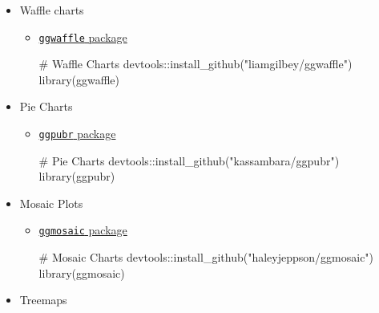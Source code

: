 \documentclass[
  letterpaper,
  DIV=11,
  numbers=noendperiod,
  oneside]{scrreprt}
\newenvironment{Shaded}{\begin{snugshade}}{\end{snugshade}}
\newcommand{\CommentTok}[1]{\textcolor[rgb]{0.37,0.37,0.37}{#1}}
\newcommand{\FunctionTok}[1]{\textcolor[rgb]{0.28,0.35,0.67}{#1}}
\newcommand{\NormalTok}[1]{\textcolor[rgb]{0.00,0.23,0.31}{#1}}
\newcommand{\SpecialCharTok}[1]{\textcolor[rgb]{0.37,0.37,0.37}{#1}}
\newcommand{\StringTok}[1]{\textcolor[rgb]{0.13,0.47,0.30}{#1}}
\begin{document}
\begin{itemize}
\item[$\boxtimes$]
  Waffle charts

  \begin{itemize}
  \item
    \href{https://liamgilbey.github.io/ggwaffle/}{\texttt{ggwaffle}
    package}

\begin{Shaded}
\begin{Highlighting}[]
\CommentTok{\# Waffle Charts}
\NormalTok{devtools}\SpecialCharTok{::}\FunctionTok{install\_github}\NormalTok{(}\StringTok{"liamgilbey/ggwaffle"}\NormalTok{)}
\FunctionTok{library}\NormalTok{(ggwaffle)}
\end{Highlighting}
\end{Shaded}
  \end{itemize}
\item[$\boxtimes$]
  Pie Charts

  \begin{itemize}
  \item
    \href{https://rpkgs.datanovia.com/ggpubr/}{\texttt{ggpubr} package}

\begin{Shaded}
\begin{Highlighting}[]
\CommentTok{\# Pie Charts }
\NormalTok{devtools}\SpecialCharTok{::}\FunctionTok{install\_github}\NormalTok{(}\StringTok{"kassambara/ggpubr"}\NormalTok{)}
\FunctionTok{library}\NormalTok{(ggpubr)}
\end{Highlighting}
\end{Shaded}
  \end{itemize}
\item[$\boxtimes$]
  Mosaic Plots

  \begin{itemize}
  \item
    \href{https://haleyjeppson.github.io/ggmosaic/}{\texttt{ggmosaic}
    package}

\begin{Shaded}
\begin{Highlighting}[]
\CommentTok{\# Mosaic Charts }
\NormalTok{devtools}\SpecialCharTok{::}\FunctionTok{install\_github}\NormalTok{(}\StringTok{"haleyjeppson/ggmosaic"}\NormalTok{)}
\FunctionTok{library}\NormalTok{(ggmosaic)}
\end{Highlighting}
\end{Shaded}
  \end{itemize}
\item[$\boxtimes$]
  Treemaps


\end{itemize}
\end{document}
